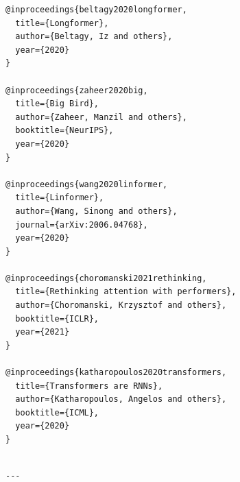 \begin{lstlisting}
@inproceedings{beltagy2020longformer,
  title={Longformer},
  author={Beltagy, Iz and others},
  year={2020}
}

@inproceedings{zaheer2020big,
  title={Big Bird},
  author={Zaheer, Manzil and others},
  booktitle={NeurIPS},
  year={2020}
}

@inproceedings{wang2020linformer,
  title={Linformer},
  author={Wang, Sinong and others},
  journal={arXiv:2006.04768},
  year={2020}
}

@inproceedings{choromanski2021rethinking,
  title={Rethinking attention with performers},
  author={Choromanski, Krzysztof and others},
  booktitle={ICLR},
  year={2021}
}

@inproceedings{katharopoulos2020transformers,
  title={Transformers are RNNs},
  author={Katharopoulos, Angelos and others},
  booktitle={ICML},
  year={2020}
}
\end{lstlisting}
\begin{lstlisting}

---
\end{lstlisting}